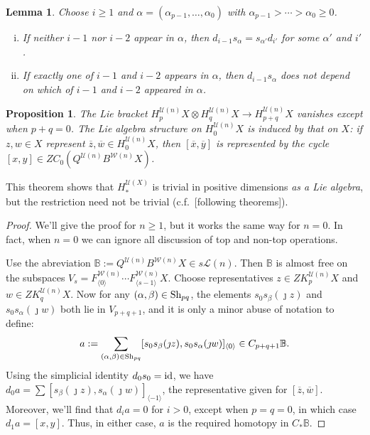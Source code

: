 \documentclass[11pt]{amsart}
\theoremstyle{plain}
\newtheorem{lem}[thm]{Lemma}
\newtheorem{prop}[thm]{Proposition}
\theoremstyle{definition}
\renewcommand{\to}{\longrightarrow}
\newcommand{\squishlist}{
  \setlength{\itemsep}{.5pt}
  \setlength{\parskip}{0pt}
  \setlength{\parsep}{0pt}}
\newcommand{\calW}{\mathcal{W}}
\newcommand{\calU}{\mathcal{U}}
\newcommand{\calL}{\mathcal{L}}
\theoremstyle{plain}
\newcommand{\Shuffles}[2]{\textup{Sh}_{#1#2}}
\newcommand{\Id}{\textup{id}}
\begin{document}
\begin{Koszul complexes}
\begin{lem}\label{LemmaOnSimplicialRelations}
Choose $i\geq1$ and $\alpha=(\alpha_{p-1},\ldots,\alpha_0)$ with $\alpha_{p-1}>\cdots >\alpha_0\geq0$.
\begin{enumerate}[i)]\squishlist
\setlength{\parindent}{.25in}
\item[i)] If neither $i-1$ nor $i-2$ appear in $\alpha$, then  $d_{i-1}s_\alpha=s_{\alpha'}d_{i'}$ for some $\alpha'$ and $i'$.
\item[ii)] If exactly one of $i-1$ and $i-2$ appears in $\alpha$, then  $d_{i-1}s_\alpha$ does not depend on which of $i-1$ and $i-2$ appeared in $\alpha$.
\end{enumerate}
\end{lem}

\begin{prop}\label{LieBracketsTrivial}
The Lie bracket $H_p^{\calU(n)}X\otimes H_q^{\calU(n)}X\to H_{p+q}^{\calU(n)}X$ vanishes except when $p+q=0$. 
The Lie algebra structure on $H_0^{\calU(n)}X$ is induced by that on $X$: if $z,w\in X$ represent $\overline{z},\overline{w}\in H_0^{\calU(n)}X$, then $[\overline{x},\overline{y}]$ is represented by the cycle $[x,y]\in ZC_0(Q^{\calU(n)}B^{\calW(n)}X)$.
\end{prop}
\noindent This theorem shows that $H_*^{\calU(X)}$ is trivial in positive dimensions \emph{as a Lie algebra}, but the restriction need not be trivial (c.f.\ [following theorems]).
\begin{proof}
We'll give the proof for $n\geq1$, but it works the same way for $n=0$. In fact, when $n=0$ we can ignore all discussion of top and non-top operations.

Use the abreviation $\mathbb{B}:=Q^{\calU(n)}B^{\calW(n)}X\in s\calL(n)$. Then $\mathbb{B}$ is almost free on the subspaces $V_s=F^{\calW(n)}_{\langle 0\rangle}\cdots F^{\calW(n)}_{\langle s-1\rangle}X$. Choose representatives $z\in ZK_p^{\calU(n)}X$ and $w\in ZK_q^{\calU(n)}X$. Now  for any $(\alpha,\beta)\in\Shuffles{p}{q}$, the elements $s_{0}s_\beta(\jmath z)$ and $s_{0}s_\alpha(\jmath w)$ both lie in $V_{p+q+1}$, and it is only a minor abuse of notation to define:
\[a:=\sum_{(\alpha,\beta)\in\Shuffles{p}{q}}[s_{0}s_\beta(\jmath z), s_{0}s_\alpha(\jmath w)]_{\langle 0\rangle}\in C_{p+q+1}\mathbb{B}.\]
Using the simplicial identity $d_0s_0=\Id$, we have $d_{0}a=\sum [s_\beta(\jmath z), s_\alpha(\jmath w)]_{\langle -1\rangle}$, the representative given for $[\overline{z},\overline{w}]$. Moreover, we'll find that $d_ia=0$ for $i>0$, except when $p=q=0$, in which case $d_1a=[x,y]$. Thus, in either case, $a$ is the required homotopy in $C_*\mathbb{B}$.


\end{proof}
\end{Koszul complexes}
\end{document}
